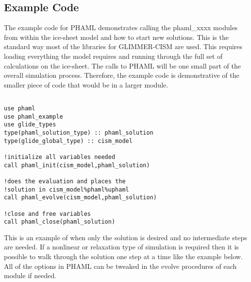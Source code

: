 \subsection{Example Code}\label{sec:examplecode}

The example code for PHAML demonstrates calling the phaml\_xxxx modules from within the ice-sheet model and how to start new solutions.  This is the standard way most of the libraries for GLIMMER-CISM are used.  This requires loading everything the model requires and running through the full set of calculations on the ice-sheet.  The calls to PHAML will be one small part of the overall simulation process.  Therefore, the example code is demonstrative of the smaller piece of code that would be in a larger module.


\begin{framecode}{6in}
\begin{verbatim}

use phaml
use phaml_example
use glide_types
type(phaml_solution_type) :: phaml_solution
type(glide_global_type) :: cism_model

!initialize all variables needed
call phaml_init(cism_model,phaml_solution)

!does the evaluation and places the 
!solution in cism_model%phaml%uphaml
call phaml_evolve(cism_model,phaml_solution)

!close and free variables
call phaml_close(phaml_solution)

\end{verbatim}
\end{framecode}

This is an example of when only the solution is desired and no intermediate steps are needed.  If a nonlinear or relaxation type of simulation is required then it is possible to walk through the solution one step at a time like the example below.  All of the options in PHAML can be tweaked in the evolve procedures of each module if needed.

